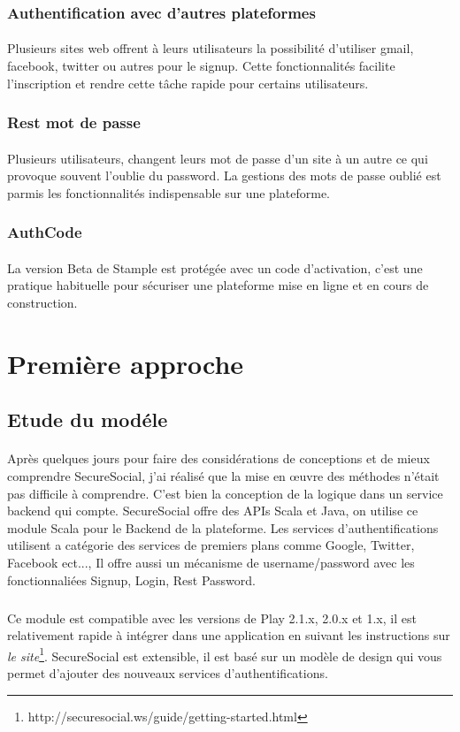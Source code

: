 \subsubsection{Authentification avec d'autres plateformes}
\paragraph{}
Plusieurs sites web offrent à leurs utilisateurs la possibilité d'utiliser gmail, facebook, twitter ou autres pour le signup.
Cette fonctionnalités facilite l'inscription et rendre cette tâche rapide pour certains utilisateurs.
\subsubsection{Rest mot de passe}
\paragraph{}
Plusieurs utilisateurs, changent leurs mot de passe d'un site à un autre ce qui provoque souvent l'oublie du password.
La gestions des mots de passe oublié est parmis les fonctionnalités indispensable sur une plateforme.
\subsubsection{AuthCode}
\paragraph{}
La version Beta de Stample est protégée avec un code d'activation, c'est une pratique habituelle pour sécuriser une plateforme mise en ligne et en cours de construction.
\section{Première approche}
\subsection{Etude du modéle}
\paragraph{}
Après quelques jours pour faire des considérations de conceptions et de mieux comprendre SecureSocial, j'ai réalisé que la mise en œuvre des méthodes n'était pas difficile à comprendre. C'est bien la conception de la logique dans un service backend qui compte. 
SecureSocial offre des APIs Scala et Java, on utilise ce module Scala pour le Backend de la plateforme.
Les services d'authentifications utilisent a catégorie des services de premiers plans comme Google, Twitter, Facebook ect..., Il offre aussi un mécanisme de username/password avec les fonctionnaliées Signup, Login, Rest Password.
\subparagraph{}
Ce module est compatible avec les versions de Play 2.1.x, 2.0.x et 1.x, il est relativement rapide à intégrer dans une application en suivant les instructions sur \textit{le site}\footnote{http://securesocial.ws/guide/getting-started.html}.
SecureSocial est extensible, il est basé sur un modèle de design qui vous permet d'ajouter des nouveaux services d'authentifications.

